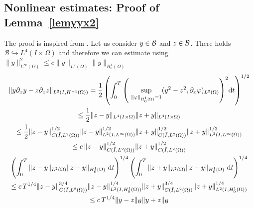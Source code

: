 \subsection{Nonlinear estimates: Proof of Lemma~\ref{lemyyx2}}
\label{sec:nonl-state-equat}
The proof is inspired from \cite[Theorem 2.8]{faminskii2010initial}. Let us consider $y \in \mathcal{B}$ and $z \in \mathcal{B}$. There holds $\mathcal B\hookrightarrow L^4(I\times \Omega)$ and therefore we can estimate using $\|y\|_{L^\infty(\Omega)}^2\leq c\|y\|_{L^2(\Omega)}\|y\|_{H^1_0(\Omega)}$
\begin{multline*}
\norm{y\partial_x y - z\partial_x z}_{\Hm1}= \frac 1 2\left(\int_0^T{\left(\ \sup_{\norm{\varphi}_{H^1_0(\Omega)} = 1}(y^2 -  z^2,\partial_x\varphi)_{L^2(\Omega)}\right)^2}\mathrm dt\right)^{1/2} \\
\leq \frac{1}{2}\norm{z-y}_{L^4(I\times \Omega)}\norm{z+y}_{L^4(I\times \Omega)}\\
\leq\frac{1}{2} \norm{z-y}_{C(\bar I,L^2(\Omega))}^{1/2}\norm{z-y}_{L^2(I,L^{\infty}(\Omega))}^{1/2}\norm{z+y}_{C(\bar I,L^2(\Omega))}^{1/2}\norm{z+y}_{L^2(I,L^{\infty}(\Omega))}^{1/2}\\
\leq c\, \norm{z-y}_{C(\bar I,L^2(\Omega))}^{1/2}\norm{z+y}_{C(\bar I,L^2(\Omega))}^{1/2}\\
\left(\int_0^T{ \norm{z-y}_{L^2(\Omega)}\norm{z-y}_{H^1_0(\Omega)}~\mathrm dt}\right)^{1/4}\left(\int_0^T{ \norm{z+y}_{L^2(\Omega)}\norm{z+y}_{H^1_0(\Omega)}~\mathrm dt}\right)^{1/4}\\
\leq c \,T^{1/4}\norm{z-y}_{C(\bar I,L^2(\Omega))}^{3/4}\norm{z-y}_{L^2(I,H^1_0(\Omega))}^{1/4}\norm{z+y}_{C(\bar I,L^2(\Omega))}^{3/4}\norm{z+y}_{L^2(I,H^1_0(\Omega))}^{1/4} \\
\leq c \,T^{1/4}\norm{y-z}_{\B}\norm{y+z}_{\B}
\end{multline*}
